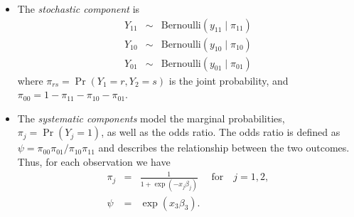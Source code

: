 \begin{itemize}
 
\item The \emph{stochastic component} is
\begin{eqnarray*}
  Y_{11} &\sim& \textrm{Bernoulli}(y_{11} \mid \pi_{11}) \\
  Y_{10} &\sim& \textrm{Bernoulli}(y_{10} \mid \pi_{10}) \\
  Y_{01} &\sim& \textrm{Bernoulli}(y_{01} \mid \pi_{01})
\end{eqnarray*}
where $\pi_{rs}=\Pr(Y_1=r, Y_2=s)$ is the joint probability, and
$\pi_{00}=1-\pi_{11}-\pi_{10}-\pi_{01}$.


\item The \emph{systematic components} model the marginal probabilities,
  $\pi_j=\Pr(Y_j=1)$, as well as the odds ratio.  The odds ratio
  is defined as $\psi = \pi_{00} \pi_{01}/\pi_{10}\pi_{11}$ and
  describes the relationship between the two outcomes.  Thus, for each
  observation we have
\begin{eqnarray*}
\pi_j & = & \frac{1}{1 + \exp(-x_j \beta_j)} \quad \textrm{ for} \quad
j=1,2, \\
\psi &= & \exp(x_3 \beta_3).
\end{eqnarray*}

\end{itemize}

